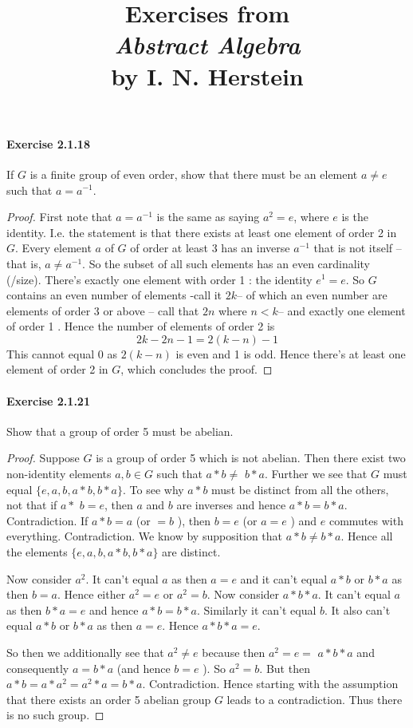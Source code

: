 \documentclass{article}
\title{\textbf{
Exercises from \\
\textit{Abstract Algebra} \\
by I. N. Herstein
}}
\date{}
\begin{document}
\maketitle

\paragraph{Exercise 2.1.18} If $G$ is a finite group of even order, show that there must be an element $a \neq e$ such that $a=a^{-1}$.
\begin{proof}
    First note that $a=a^{-1}$ is the same as saying $a^2=e$, where $e$ is the identity. I.e. the statement is that there exists at least one element of order 2 in $G$.
Every element $a$ of $G$ of order at least 3 has an inverse $a^{-1}$ that is not itself -- that is, $a \neq a^{-1}$. So the subset of all such elements has an even cardinality (/size). There's exactly one element with order 1 : the identity $e^1=e$. So $G$ contains an even number of elements -call it $2 k$-- of which an even number are elements of order 3 or above -- call that $2 n$ where $n<k$-- and exactly one element of order 1 . Hence the number of elements of order 2 is
$$
2 k-2 n-1=2(k-n)-1
$$
This cannot equal 0 as $2(k-n)$ is even and 1 is odd. Hence there's at least one element of order 2 in $G$, which concludes the proof.
\end{proof}


\paragraph{Exercise 2.1.21} Show that a group of order 5 must be abelian.
\begin{proof}
    Suppose $G$ is a group of order 5 which is not abelian. Then there exist two non-identity elements $a, b \in G$ such that $a * b \neq$ $b * a$. Further we see that $G$ must equal $\{e, a, b, a * b, b * a\}$. To see why $a * b$ must be distinct from all the others, not that if $a *$ $b=e$, then $a$ and $b$ are inverses and hence $a * b=b * a$.
Contradiction. If $a * b=a$ (or $=b$ ), then $b=e$ (or $a=e$ ) and $e$ commutes with everything. Contradiction. We know by supposition that $a * b \neq b * a$. Hence all the elements $\{e, a, b, a * b, b * a\}$ are distinct.

Now consider $a^2$. It can't equal $a$ as then $a=e$ and it can't equal $a * b$ or $b * a$ as then $b=a$. Hence either $a^2=e$ or $a^2=b$.
Now consider $a * b * a$. It can't equal $a$ as then $b * a=e$ and hence $a * b=b * a$. Similarly it can't equal $b$. It also can't equal $a * b$ or $b * a$ as then $a=e$. Hence $a * b * a=e$.

So then we additionally see that $a^2 \neq e$ because then $a^2=e=$ $a * b * a$ and consequently $a=b * a$ (and hence $b=e$ ). So $a^2=b$. But then $a * b=a * a^2=a^2 * a=b * a$. Contradiction.
Hence starting with the assumption that there exists an order 5 abelian group $G$ leads to a contradiction. Thus there is no such group.
\end{proof}
\end{document}
